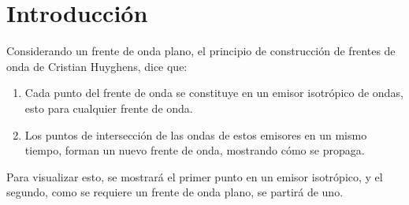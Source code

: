 \section{Introducción}

Considerando un frente de onda plano, el principio de construcción de
frentes de onda de Cristian Huyghens, dice que:
\begin{enumerate}
    \item Cada punto del frente de onda se constituye en un emisor
    isotrópico de ondas, esto para cualquier frente de onda.

    \item Los puntos de intersección de las ondas de estos emisores en
    un mismo tiempo, forman un nuevo frente de onda, mostrando cómo se
    propaga.
\end{enumerate}

Para visualizar esto, se mostrará el primer punto en un emisor
isotrópico, y el segundo, como se requiere un frente de onda plano, se
partirá de uno.

